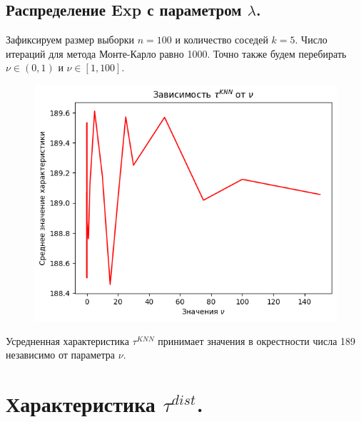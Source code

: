 \documentclass{report}
\begin{document}
\subsection{Распределение Exp с параметром $\lambda$.}
Зафиксируем размер выборки $n = 100$ и количество соседей $k = 5$. Число итераций для метода Монте-Карло равно 1000.
\newline
\newline
Точно также будем перебирать $\nu \in (0, 1)$ и $\nu \in [1, 100]$.
\newline
\newline
\begin{figure}[h]
    \centering
    \includegraphics[width=0.5\linewidth]{4.png}
\end{figure}
\newline
\newline
Усредненная характеристика $\tau^{KNN}$ принимает значения в окрестности числа 189 независимо от параметра $\nu$.

\section{Характеристика $\tau^{dist}$.}
\end{document}
